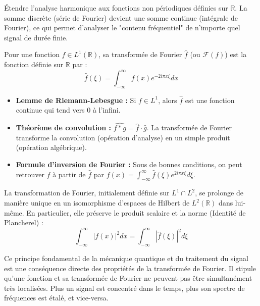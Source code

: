 \begin{objectif}
    Étendre l'analyse harmonique aux fonctions non périodiques définies sur $\mathbb{R}$. La somme discrète (série de Fourier) devient une somme continue (intégrale de Fourier), ce qui permet d'analyser le "contenu fréquentiel" de n'importe quel signal de durée finie.
\end{objectif}

\begin{definition}
    Pour une fonction $f \in L^1(\mathbb{R})$, sa transformée de Fourier $\hat{f}$ (ou $\mathcal{F}(f)$) est la fonction définie sur $\mathbb{R}$ par :
    $$ \hat{f}(\xi) = \int_{-\infty}^\infty f(x) e^{-2i\pi x \xi} dx $$
\end{definition}

\begin{theorem}
    \begin{itemize}
        \item \textbf{Lemme de Riemann-Lebesgue :} Si $f \in L^1$, alors $\hat{f}$ est une fonction continue qui tend vers 0 à l'infini.
        \item \textbf{Théorème de convolution :} $\widehat{f*g} = \hat{f} \cdot \hat{g}$. La transformée de Fourier transforme la convolution (opération d'analyse) en un simple produit (opération algébrique).
        \item \textbf{Formule d'inversion de Fourier :} Sous de bonnes conditions, on peut retrouver $f$ à partir de $\hat{f}$ par $f(x) = \int_{-\infty}^\infty \hat{f}(\xi) e^{2i\pi x \xi} d\xi$.
    \end{itemize}
\end{theorem}

\begin{theorem}
    La transformation de Fourier, initialement définie sur $L^1 \cap L^2$, se prolonge de manière unique en un isomorphisme d'espaces de Hilbert de $L^2(\mathbb{R})$ dans lui-même. En particulier, elle préserve le produit scalaire et la norme (Identité de Plancherel) :
    $$ \int_{-\infty}^\infty |f(x)|^2 dx = \int_{-\infty}^\infty |\hat{f}(\xi)|^2 d\xi $$
\end{theorem}

\begin{application}
    Ce principe fondamental de la mécanique quantique et du traitement du signal est une conséquence directe des propriétés de la transformée de Fourier. Il stipule qu'une fonction et sa transformée de Fourier ne peuvent pas être simultanément très localisées. Plus un signal est concentré dans le temps, plus son spectre de fréquences est étalé, et vice-versa.
\end{application}

